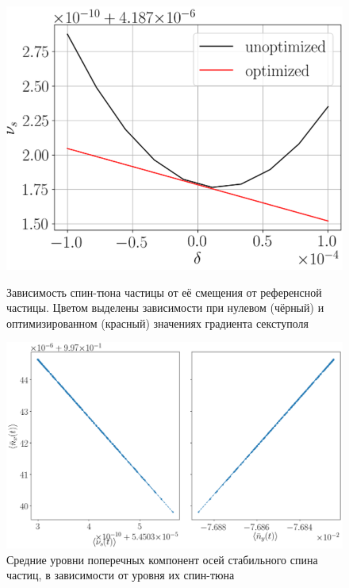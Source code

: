 \begin{figure}[H]
\begin{minipage}{.5\linewidth}
{		\includegraphics[height=.2\paperheight]{images/decoh_sim/spin_tune_decoh_d_offset_1}}
	\end{minipage}%
	\begin{minipage}{.5\linewidth}
	\caption{Зависимость спин-тюна частицы от её смещения от референсной частицы.\label{fig:decoh:perfect}
	Цветом выделены зависимости при нулевом (чёрный) и оптимизированном (красный) значениях градиента секступоля}
	\end{minipage}
\end{figure}

\begin{figure}[H]\centering
	\includegraphics[height=.3\paperheight]{images/decoh_sim/mean_n_bar_vs_spin_tune}
	\caption{Средние уровни поперечных компонент осей стабильного спина частиц, в зависимости от уровня их спин-тюна\label{decoh:fig:nbar_vs_ST}}
\end{figure}

